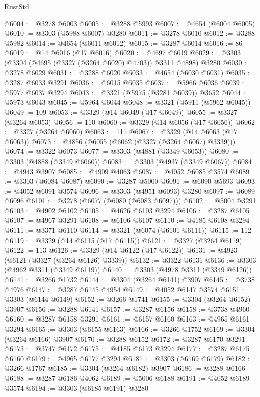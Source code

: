 \begin{lexlean}{RustStd}
\begin{coremodule}
{\begin{coremodule}
{{{{{{{{{{{{{{{{{{{{{{{{{{{{{{{{{@6004 := @3278 @6003
@6005 := @3288 @5993
@6007 := @4654 (@6004 @6005)
@6010 := @3303 (@5988 @6007) @3280
@6011 := @3278 @6010
@6012 := @3288 @5982
@6014 := @4654 (@6011 @6012)
@6015 := @3287 @6014
@6016 := 86
@6019 := @14 @6016 (@17 @6016)
@6020 := @4697 @6019
@6029 := @3303 (@3304 (@4695 (@3327 (@3264 @6020) @4703)) @3311 @4898) @3280
@6030 := @3278 @6029
@6031 := @3288 @6020
@6033 := @4654 (@6030 @6031)
@6035 := @3287 @6033 @3291
@6036 := @6015 @6035
@6037 := @5966 @6036
@6039 := @5977 @6037 @3294
@6043 := @3321 (@5975 (@3281 @6039)) @3652
@6044 := @5973 @6043
@6045 := @5964 @6044
@6048 := @3321 (@5911 (@5962 @6045))
@6049 := 109
@6053 := @3329 (@14 @6049 (@17 @6049))
@6055 := @3327 (@3264 @6053)
@6056 := 110
@6060 := @3329 (@14 @6056 (@17 @6056))
@6062 := @3327 (@3264 @6060)
@6063 := 111
@6067 := @3329 (@14 @6063 (@17 @6063))
@6073 := @4856 (@6055 (@6062 (@3327 (@3264 @6067) @3339)))
@6074 := @3322 @6073
@6077 := @3303 (@4881 (@3349 @6053))
@6080 := @3303 (@4888 (@3349 @6060))
@6083 := @3303 (@4937 (@3349 @6067))
@6084 := @4943 @3907
@6085 := @4909 @4063
@6087 := @4052 @6085 @3574
@6089 := @3303 (@6084 @6087)
@6090 := @3287 @5000
@6091 := @6090 @5693
@6093 := @4052 @6091 @3574
@6096 := @3303 (@4951 @6093) @3280
@6097 := @6089 @6096
@6101 := @3278 (@6077 (@6080 (@6083 @6097)))
@6102 := @5004 @3291
@6103 := @4902 @6102
@6105 := @4626 @6103 @3294
@6106 := @3287 @6105
@6107 := @4967 @3291
@6108 := @6106 @6107
@6110 := @4185 @6108 @3294
@6111 := @3371 @6110
@6114 := @3321 (@6074 (@6101 @6111))
@6115 := 112
@6119 := @3329 (@14 @6115 (@17 @6115))
@6121 := @3327 (@3264 @6119)
@6122 := 113
@6126 := @3329 (@14 @6122 (@17 @6122))
@6131 := @4923 (@6121 (@3327 (@3264 @6126) @3339))
@6132 := @3322 @6131
@6136 := @3303 (@4962 @3311 (@3349 @6119))
@6140 := @3303 (@4978 @3311 (@3349 @6126))
@6141 := @3266 @1732
@6144 := @3304 (@3264 @6141) @3907
@6145 := @3738 @4976
@6147 := @3287 @6145 @4954
@6149 := @4052 @6147 @3574
@6151 := @3303 (@6144 @6149)
@6152 := @3266 @1741
@6155 := @3304 (@3264 @6152) @3907
@6156 := @3288 @6141
@6157 := @3287 @6156
@6158 := @3738 @4960
@6160 := @3287 @6158 @3291
@6161 := @6157 @6160
@6163 := @4965 @6161 @3294
@6165 := @3303 (@6155 @6163)
@6166 := @3266 @1752
@6169 := @3304 (@3264 @6166) @3907
@6170 := @3288 @6152
@6172 := @3287 @6170 @3291
@6173 := @3747 @6172
@6175 := @4185 @6173 @3294
@6177 := @3287 @6175 @6160
@6179 := @4965 @6177 @3294
@6181 := @3303 (@6169 @6179)
@6182 := @3266 @1767
@6185 := @3304 (@3264 @6182) @3907
@6186 := @3288 @6166
@6188 := @3287 @6186 @4062
@6189 := @5006 @6188
@6191 := @4052 @6189 @3574
@6194 := @3303 (@6185 @6191) @3280
}}}}}}}}}}}}}}}}}}}}}}}}}}}}}}}}}
\end{coremodule}}
\end{coremodule}
\end{lexlean}
